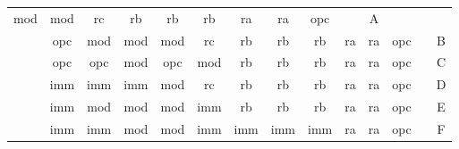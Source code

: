 \begin{table}[hbt!]
\begin{tabular}{cccccccccccccc}
  \multicolumn{1}{c|}{mod} &
  \multicolumn{1}{c|}{mod} &
  \multicolumn{1}{c|}{rc} &
  \multicolumn{1}{c|}{rb} &
  \multicolumn{1}{c|}{rb} &
  \multicolumn{1}{c|}{rb} &
  \multicolumn{1}{c|}{ra} &
  \multicolumn{1}{c|}{ra} &
  \multicolumn{1}{c|}{opc} &
  \multicolumn{1}{c|}{} &
  \multicolumn{1}{c|}{A} \\ \cline{2-12} \cline{14-14} 
\multicolumn{1}{c|}{} &
  \multicolumn{1}{c|}{opc} &
  \multicolumn{1}{c|}{mod} &
  \multicolumn{1}{c|}{mod} &
  \multicolumn{1}{c|}{mod} &
  \multicolumn{1}{c|}{rc} &
  \multicolumn{1}{c|}{rb} &
  \multicolumn{1}{c|}{rb} &
  \multicolumn{1}{c|}{rb} &
  \multicolumn{1}{c|}{ra} &
  \multicolumn{1}{c|}{ra} &
  \multicolumn{1}{c|}{opc} &
  \multicolumn{1}{c|}{} &
  \multicolumn{1}{c|}{B} \\ \cline{2-12} \cline{14-14} 
\multicolumn{1}{c|}{} &
  \multicolumn{1}{c|}{opc} &
  \multicolumn{1}{c|}{opc} &
  \multicolumn{1}{c|}{mod} &
  \multicolumn{1}{c|}{opc} &
  \multicolumn{1}{c|}{mod} &
  \multicolumn{1}{c|}{rb} &
  \multicolumn{1}{c|}{rb} &
  \multicolumn{1}{c|}{rb} &
  \multicolumn{1}{c|}{ra} &
  \multicolumn{1}{c|}{ra} &
  \multicolumn{1}{c|}{opc} &
  \multicolumn{1}{c|}{} &
  \multicolumn{1}{c|}{C} \\ \cline{2-12} \cline{14-14} 
\multicolumn{1}{c|}{} &
  \multicolumn{1}{c|}{imm} &
  \multicolumn{1}{c|}{imm} &
  \multicolumn{1}{c|}{imm} &
  \multicolumn{1}{c|}{mod} &
  \multicolumn{1}{c|}{rc} &
  \multicolumn{1}{c|}{rb} &
  \multicolumn{1}{c|}{rb} &
  \multicolumn{1}{c|}{rb} &
  \multicolumn{1}{c|}{ra} &
  \multicolumn{1}{c|}{ra} &
  \multicolumn{1}{c|}{opc} &
  \multicolumn{1}{c|}{} &
  \multicolumn{1}{c|}{D} \\ \cline{2-12} \cline{14-14} 
\multicolumn{1}{c|}{} &
  \multicolumn{1}{c|}{imm} &
  \multicolumn{1}{c|}{mod} &
  \multicolumn{1}{c|}{mod} &
  \multicolumn{1}{c|}{mod} &
  \multicolumn{1}{c|}{imm} &
  \multicolumn{1}{c|}{rb} &
  \multicolumn{1}{c|}{rb} &
  \multicolumn{1}{c|}{rb} &
  \multicolumn{1}{c|}{ra} &
  \multicolumn{1}{c|}{ra} &
  \multicolumn{1}{c|}{opc} &
  \multicolumn{1}{c|}{} &
  \multicolumn{1}{c|}{E} \\ \cline{2-12} \cline{14-14} 
\multicolumn{1}{c|}{} &
  \multicolumn{1}{c|}{imm} &
  \multicolumn{1}{c|}{imm} &
  \multicolumn{1}{c|}{mod} &
  \multicolumn{1}{c|}{mod} &
  \multicolumn{1}{c|}{imm} &
  \multicolumn{1}{c|}{imm} &
  \multicolumn{1}{c|}{imm} &
  \multicolumn{1}{c|}{imm} &
  \multicolumn{1}{c|}{ra} &
  \multicolumn{1}{c|}{ra} &
  \multicolumn{1}{c|}{opc} &
  \multicolumn{1}{c|}{} &
  \multicolumn{1}{c|}{F} \\ \cline{2-12} \cline{14-14} 

\end{tabular}
\end{table}
